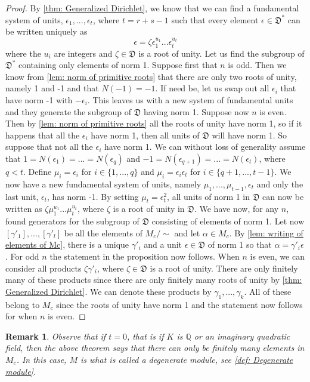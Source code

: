 \documentclass{article}
\newtheorem{remark}{Remark}[section]
\newcommand{\mfrak}[1]{\mathfrak{#1}}
\newcommand{\mbb}[1]{\mathbb{#1}}
\numberwithin{equation}{section}
\begin{document}
\begin{proof}
	By \cref{thm: Generalized Dirichlet}, we know that we can find a fundamental system of units, $\epsilon_1, ..., \epsilon_t$, where $t = r+s-1$ such that every element $\epsilon \in \mfrak D^*$ can be written uniquely as
	$$\epsilon = \zeta \epsilon_1^{u_1} ... \epsilon_t^{u_t}$$
	where the $u_i$ are integers and $\zeta \in \mfrak D$ is a root of unity. Let us find the subgroup of $\mfrak D^*$ containing only elements of norm 1. Suppose first that $n$ is odd. Then we know from \cref{lem: norm of primitive roots} that there are only two roots of unity, namely 1 and -1 and that $N(-1) = -1$. If need be, let us swap out all $\epsilon_i$ that have norm -1 with $-\epsilon_i$. This leaves us with a new system of fundamental units and they generate the subgroup of $\mfrak D$ having norm 1. Suppose now $n$ is even. Then by \cref{lem: norm of primitive roots} all the roots of unity have norm 1, so if it happens that all the $\epsilon_i$ have norm 1, then all units of $\mfrak D$ will have norm 1. So suppose that not all the $\epsilon_i$ have norm 1. We can without loss of generality assume that $1 = N(\epsilon_1) = ... = N(\epsilon_q)$ and $-1 = N(\epsilon_{q+1}) = ... = N(\epsilon_t)$, where $q < t$. Define
	$\mu_i = \epsilon_i$ for $i \in \{1, ..., q\}$ and $\mu_i = \epsilon_i \epsilon_t$ for $i \in \{q+1, ..., t-1\}$. We now have a new fundamental system of units, namely $\mu_1, ..., \mu_{t-1},\epsilon_t$ and only the last unit, $\epsilon_t$, has norm -1. By setting $\mu_t = \epsilon_t^2$, all units of norm 1 in $\mfrak D$ can now be written as $\zeta \mu_1^{u_1}...\mu_t^{u_t}$, where $\zeta$ is a root of unity in $\mfrak D$. We have now, for any $n$, found generators for the subgroup of $\mfrak D$ consisting of elements of norm 1. Let now $[\gamma'_1], ..., [\gamma'_l]$ be all the elements of $M_c / \sim$ and let $\alpha \in M_c$. By \cref{lem: writing of elements of Mc}, there is a unique $\gamma'_i$ and a unit $\epsilon \in \mfrak D$ of norm 1 so that $\alpha = \gamma'_i \epsilon$. For odd $n$ the statement in the proposition now follows. When $n$ is even, we can consider all products $\zeta \gamma'_i$, where $\zeta \in \mfrak D$ is a root of unity. There are only finitely many of these products since there are only finitely many roots of unity by \cref{thm: Generalized Dirichlet}. We can denote these products by $\gamma_1, ..., \gamma_k$. All of these belong to $M_c$ since the roots of unity have norm 1 and the statement now follows for when $n$ is even.
\end{proof}
\begin{remark}\label{rem: When does a full module have finitely many solutions}
	Observe that if $t = 0$, that is if $K$ is $\mbb Q$ or an imaginary quadratic field, then the above theorem says that there can only be finitely many elements in $M_c$. In this case, $M$ is what is called a degenerate module, see \cref{def: Degenerate module}.
\end{remark}
\end{document}
